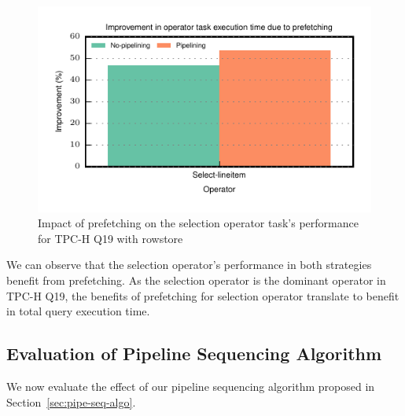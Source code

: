 \begin{figure}
	\centering 
	\includegraphics[width=0.6\textheight]{pipeline/figures/tpch-q19-rowstore-prefetching-benefits-selectionwo}
	\caption{Impact of prefetching on the selection operator task's performance for TPC-H Q19 with rowstore}
	\label{fig:tpch-q19-prefetching-benefits-selectionwo}
\end{figure}

We can observe that the selection operator's performance in both strategies benefit from prefetching. 
As the selection operator is the dominant operator in TPC-H Q19, the benefits of prefetching for selection operator translate to benefit in total query execution time. 

\subsection{Evaluation of Pipeline Sequencing Algorithm}
We now evaluate the effect of our pipeline sequencing algorithm proposed in Section~\ref{sec:pipe-seq-algo}.

